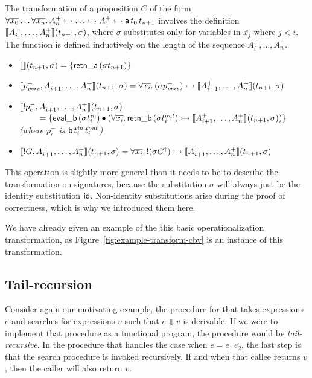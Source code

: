 The transformation of a proposition $C$ of the form $\forall
\overline{x_0}\ldots \forall \overline{x_n}.\,A^+_n \rightarrowtail \ldots
\rightarrowtail A^+_1 \rightarrowtail {\sf a}\,t_{0}\,t_{n+1}$ involves the definition
$\llbracket {A^+_i,\ldots,A^+_n} \rrbracket({t_{n+1}},{\sigma})$, where $\sigma$
substitutes only for variables in $\overline{x_j}$ where $j < i$. The
function is defined inductively on the length of the sequence
$A^+_i,\ldots,A^+_n$.

\begin{itemize}
\item $\llbracket {} \rrbracket({t_{n+1}},{\sigma}) = \{ {\sf retn\_a}\,(\sigma{t_{n+1}}) \}$
\item $\llbracket {p^+_{\it pers},A^+_{i+1},\ldots,A^+_n} \rrbracket({t_{n+1}},{\sigma}) 
  = \forall \overline{x_i}.\, (\sigma{p^+_{\it pers}}) \rightarrowtail \llbracket {A^+_{i+1},\ldots,A^+_n} \rrbracket({t_{n+1}},{\sigma})$
\item $\llbracket {{!}p^-_c,A^+_{i+1},\ldots,A^+_n} \rrbracket({t_{n+1}},{\sigma})$
  \\
  $~ \qquad = \{ {\sf eval\_b}\,({\sigma}t^{\it in}_i) \mathbin{\bullet}
  (\forall\overline{x_i}.\, {\sf retn\_b}\,(\sigma{t^{\it out}_i})
  \rightarrowtail \llbracket {A^+_{i+1},\ldots,A^+_n} \rrbracket({t_{n+1}},{\sigma})) \}$\\
  {\it (where $p^-_c$ is ${\sf b}\,t^{\it in}_i\,t^{\it out}_i$)}
\item $\llbracket {{!}G,A^+_{i+1},\ldots,A^+_n} \rrbracket({t_{n+1}},{\sigma}) = \forall
  \overline{x_i}.\, {!}(\sigma{{G}^\dag}) \rightarrowtail
  \llbracket {A^+_{i+1},\ldots,A^+_n} \rrbracket({t_{n+1}},{\sigma})$
\end{itemize}

\noindent
This operation is slightly more general than it needs to be to
describe the transformation on signatures, because the substitution
$\sigma$ will always just be the identity substitution ${\sf id}$.
Non-identity substitutions arise during the proof of correctness, which
is why we introduced them here.

We have already given an example of the this basic operationalization
transformation, as Figure~\ref{fig:example-transform-cbv} is an
instance of this transformation.

\subsection{Tail-recursion}
\label{sec:trans-tail}

Consider again our motivating example, the procedure for that takes
expressions $e$ and searches for expressions $v$ such that $e
\Downarrow v$ is derivable. If we were to implement that procedure as
a functional program, the procedure would be {\it tail-recursive}. In
the procedure that handles the case when $e = e_1\,e_2$, the last step
is that the search procedure is invoked recursively. If and when that
callee returns $v$, then the caller will also return $v$.

